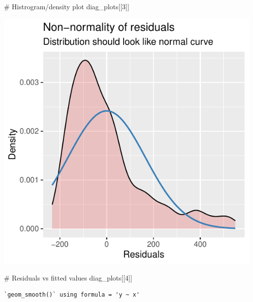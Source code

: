 \documentclass[
  letterpaper,
  DIV=11,
  numbers=noendperiod]{scrartcl}
\newenvironment{Shaded}{\begin{snugshade}}{\end{snugshade}}
\newcommand{\CommentTok}[1]{\textcolor[rgb]{0.37,0.37,0.37}{#1}}
\newcommand{\DecValTok}[1]{\textcolor[rgb]{0.68,0.00,0.00}{#1}}
\newcommand{\NormalTok}[1]{\textcolor[rgb]{0.00,0.23,0.31}{#1}}
\begin{document}
\begin{tcolorbox}
\begin{Shaded}
\begin{Highlighting}[]
\CommentTok{\# Histrogram/density plot}
\NormalTok{diag\_plots[[}\DecValTok{3}\NormalTok{]]}
\end{Highlighting}
\end{Shaded}

\begin{center}
\includegraphics{index_files/figure-pdf/unnamed-chunk-34-2.pdf}
\end{center}

\begin{Shaded}
\begin{Highlighting}[]
\CommentTok{\# Residuals vs fitted values}
\NormalTok{diag\_plots[[}\DecValTok{4}\NormalTok{]]}
\end{Highlighting}
\end{Shaded}

\begin{verbatim}
`geom_smooth()` using formula = 'y ~ x'
\end{verbatim}


\end{tcolorbox}
\end{document}
